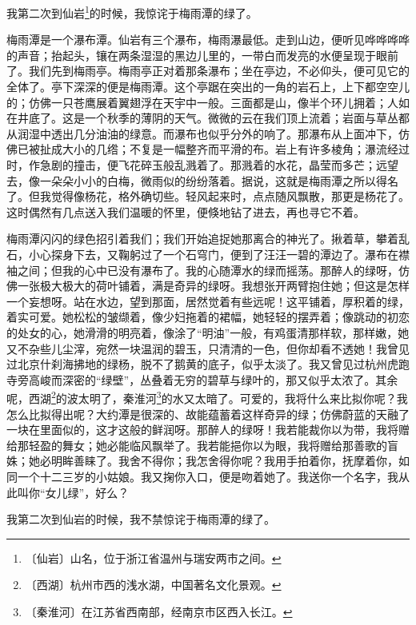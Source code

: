 \documentclass[12pt,UTF-8,openany]{ctexbook}
\begin{document}
\begin{normalsize}
    
    我第二次到仙岩\footnote{〔仙岩〕山名，位于浙江省温州与瑞安两市之间。}的时候，我惊诧于梅雨潭的绿了。
    
    梅雨潭是一个瀑布潭。仙岩有三个瀑布，梅雨瀑最低。走到山边，便听见哗哗哗哗的声音；抬起头，镶在两条湿湿的黑边儿里的，一带白而发亮的水便呈现于眼前了。我们先到梅雨亭。梅雨亭正对着那条瀑布；坐在亭边，不必仰头，便可见它的全体了。亭下深深的便是梅雨潭。这个亭踞在突出的一角的岩石上，上下都空空儿的；仿佛一只苍鹰展着翼翅浮在天宇中一般。三面都是山，像半个环儿拥着；人如在井底了。这是一个秋季的薄阴的天气。微微的云在我们顶上流着；岩面与草丛都从润湿中透出几分油油的绿意。而瀑布也似乎分外的响了。那瀑布从上面冲下，仿佛已被扯成大小的几绺；不复是一幅整齐而平滑的布。岩上有许多棱角；瀑流经过时，作急剧的撞击，便飞花碎玉般乱溅着了。那溅着的水花，晶莹而多芒；远望去，像一朵朵小小的白梅，微雨似的纷纷落着。据说，这就是梅雨潭之所以得名了。但我觉得像杨花，格外确切些。轻风起来时，点点随风飘散，那更是杨花了。这时偶然有几点送入我们温暖的怀里，便倏地钻了进去，再也寻它不着。
    
    梅雨潭闪闪的绿色招引着我们；我们开始追捉她那离合的神光了。揪着草，攀着乱石，小心探身下去，又鞠躬过了一个石穹门，便到了汪汪一碧的潭边了。瀑布在襟袖之间；但我的心中已没有瀑布了。我的心随潭水的绿而摇荡。那醉人的绿呀，仿佛一张极大极大的荷叶铺着，满是奇异的绿呀。我想张开两臂抱住她；但这是怎样一个妄想呀。站在水边，望到那面，居然觉着有些远呢！这平铺着，厚积着的绿，着实可爱。她松松的皱缬着，像少妇拖着的裙幅，她轻轻的摆弄着；像跳动的初恋的处女的心，她滑滑的明亮着，像涂了“明油”一般，有鸡蛋清那样软，那样嫩，她又不杂些儿尘滓，宛然一块温润的碧玉，只清清的一色，但你却看不透她！我曾见过北京什刹海拂地的绿杨，脱不了鹅黄的底子，似乎太淡了。我又曾见过杭州虎跑寺旁高峻而深密的“绿壁”，丛叠着无穷的碧草与绿叶的，那又似乎太浓了。其余呢，西湖\footnote{〔西湖〕杭州市西的浅水湖，中国著名文化景观。}的波太明了，秦淮河\footnote{〔秦淮河〕在江苏省西南部，经南京市区西入长江。}的水又太暗了。可爱的，我将什么来比拟你呢？我怎么比拟得出呢？大约潭是很深的、故能蕴蓄着这样奇异的绿；仿佛蔚蓝的天融了一块在里面似的，这才这般的鲜润呀。那醉人的绿呀！我若能裁你以为带，我将赠给那轻盈的舞女；她必能临风飘举了。我若能挹你以为眼，我将赠给那善歌的盲姝；她必明眸善睐了。我舍不得你；我怎舍得你呢？我用手拍着你，抚摩着你，如同一个十二三岁的小姑娘。我又掬你入口，便是吻着她了。我送你一个名字，我从此叫你“女儿绿”，好么？
    
    我第二次到仙岩的时候，我不禁惊诧于梅雨潭的绿了。
    
\end{normalsize}
\end{document}
